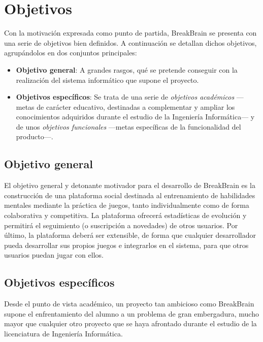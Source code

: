 \section{Objetivos}
\label{sec::objetivos}

Con la motivación expresada como punto de partida, BreakBrain se presenta con una serie de objetivos bien definidos. A continuación se detallan dichos objetivos, agrupándolos en dos conjuntos principales:

\begin{itemize}
\item {\bf Objetivo general}: A grandes rasgos, qué se pretende conseguir con la realización del sistema informático que supone el proyecto.
\item {\bf Objetivos específicos}: Se trata de una serie de {\it objetivos académicos} ---metas de carácter educativo, destinadas a complementar y ampliar los conocimientos adquiridos durante el estudio de la Ingeniería Informática--- y de unos {\it objetivos funcionales} ---metas específicas de la funcionalidad del producto---.
\end{itemize}

\subsection{Objetivo general}

El objetivo general y detonante motivador para el desarrollo de BreakBrain es la construcción de una plataforma social destinada al entrenamiento de habilidades mentales mediante la práctica de juegos, tanto individualmente como de forma colaborativa y competitiva. La plataforma ofrecerá estadísticas de evolución y permitirá el seguimiento (o suscripción a novedades) de otros usuarios. Por último, la plataforma deberá ser extensible, de forma que cualquier desarrollador pueda desarrollar sus propios juegos e integrarlos en el sistema, para que otros usuarios puedan jugar con ellos.

\subsection{Objetivos específicos}

Desde el punto de vista académico, un proyecto tan ambicioso como BreakBrain supone el enfrentamiento del alumno a un problema de gran embergadura, mucho mayor que cualquier otro proyecto que se haya afrontado durante el estudio de la licenciatura de Ingeniería Informática.

